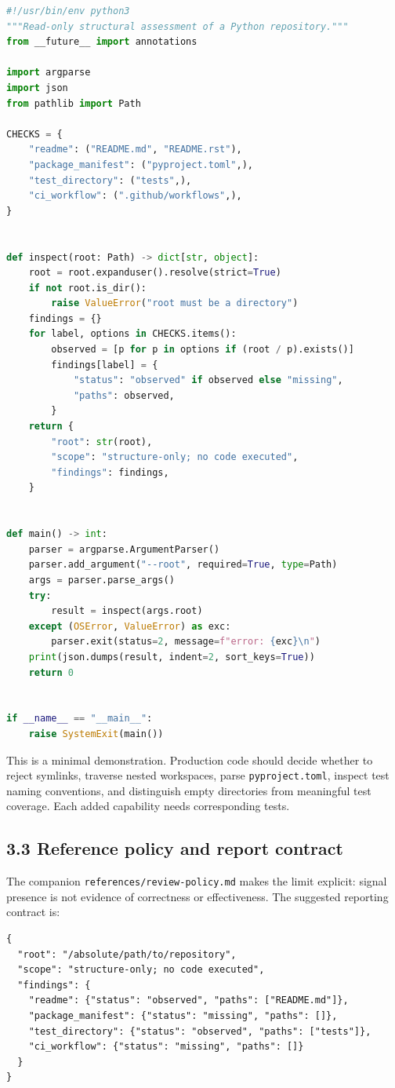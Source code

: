 \documentclass[
  10pt,
  letterpaper,
]{article}
\newcommand{\passthrough}[1]{#1}
\begin{document}
\begin{lstlisting}[language=Python]
#!/usr/bin/env python3
"""Read-only structural assessment of a Python repository."""
from __future__ import annotations

import argparse
import json
from pathlib import Path

CHECKS = {
    "readme": ("README.md", "README.rst"),
    "package_manifest": ("pyproject.toml",),
    "test_directory": ("tests",),
    "ci_workflow": (".github/workflows",),
}


def inspect(root: Path) -> dict[str, object]:
    root = root.expanduser().resolve(strict=True)
    if not root.is_dir():
        raise ValueError("root must be a directory")
    findings = {}
    for label, options in CHECKS.items():
        observed = [p for p in options if (root / p).exists()]
        findings[label] = {
            "status": "observed" if observed else "missing",
            "paths": observed,
        }
    return {
        "root": str(root),
        "scope": "structure-only; no code executed",
        "findings": findings,
    }


def main() -> int:
    parser = argparse.ArgumentParser()
    parser.add_argument("--root", required=True, type=Path)
    args = parser.parse_args()
    try:
        result = inspect(args.root)
    except (OSError, ValueError) as exc:
        parser.exit(status=2, message=f"error: {exc}\n")
    print(json.dumps(result, indent=2, sort_keys=True))
    return 0


if __name__ == "__main__":
    raise SystemExit(main())
\end{lstlisting}

This is a minimal demonstration. Production code should decide whether
to reject symlinks, traverse nested workspaces, parse
\passthrough{\lstinline!pyproject.toml!}, inspect test naming
conventions, and distinguish empty directories from meaningful test
coverage. Each added capability needs corresponding tests.

\subsection{3.3 Reference policy and report
contract}\label{reference-policy-and-report-contract}

The companion \passthrough{\lstinline!references/review-policy.md!}
makes the limit explicit: signal presence is not evidence of correctness
or effectiveness. The suggested reporting contract is:

\begin{lstlisting}
{
  "root": "/absolute/path/to/repository",
  "scope": "structure-only; no code executed",
  "findings": {
    "readme": {"status": "observed", "paths": ["README.md"]},
    "package_manifest": {"status": "missing", "paths": []},
    "test_directory": {"status": "observed", "paths": ["tests"]},
    "ci_workflow": {"status": "missing", "paths": []}
  }
}
\end{lstlisting}
\end{document}
